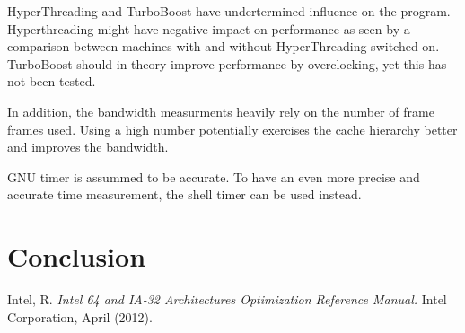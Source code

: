 \documentclass[journal]{IEEEtran}
\begin{document}
HyperThreading and TurboBoost have undertermined influence on the program. Hyperthreading might have negative impact on performance as seen by a comparison between machines with and without HyperThreading switched on. TurboBoost should in theory improve performance by overclocking, yet this has not been tested. 

In addition, the bandwidth measurments heavily rely on the number of frame frames used. Using a high number potentially exercises the cache hierarchy better and improves the bandwidth. 

GNU timer is assummed to be accurate. To have an even more precise and accurate time measurement, the shell timer can be used instead. 

\section{Conclusion}	%


%
%
%

\begin{thebibliography}{1}

Intel, R. \emph{Intel 64 and IA-32 Architectures Optimization Reference Manual.} Intel Corporation, April (2012).



\end{thebibliography}
\end{document}
